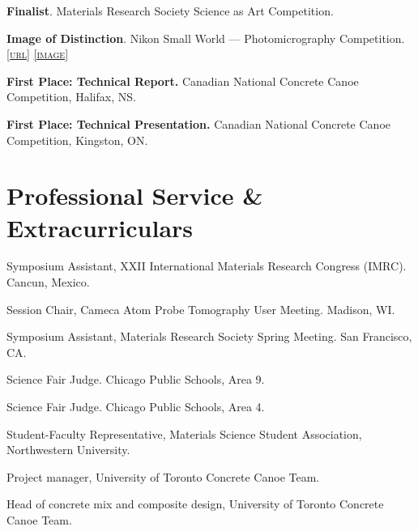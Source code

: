 \textbf{Finalist}. Materials Research Society Science as Art Competition.

\textbf{Image of Distinction}. Nikon Small World --- Photomicrography Competition. \href{http://www.nikonsmallworld.com/detail/year/2009/66}{\textsc{\footnotesize{[url]}}} \href{http://lylegordon.ca/nikon2009.jpg}{\textsc{\footnotesize{[image]}}}

\textbf{First Place: Technical Report.} Canadian National Concrete Canoe Competition, Halifax, NS.

\textbf{First Place: Technical Presentation.} Canadian National Concrete Canoe Competition, Kingston, ON.
\endgroup

\section*{Professional Service \& Extracurriculars}
Symposium Assistant, XXII International Materials Research Congress (IMRC). Cancun, Mexico.
\begingroup\setlength{\parskip}{0.1cm}

Session Chair, Cameca Atom Probe Tomography User Meeting. Madison, WI.

Symposium Assistant, Materials Research Society Spring Meeting. San Francisco, CA.

Science Fair Judge. Chicago Public Schools, Area 9.

Science Fair Judge. Chicago Public Schools, Area 4.

Student-Faculty Representative, Materials Science Student Association, Northwestern University.

Project manager, University of Toronto Concrete Canoe Team.

Head of concrete mix and composite design, University of Toronto Concrete Canoe Team.
\endgroup

